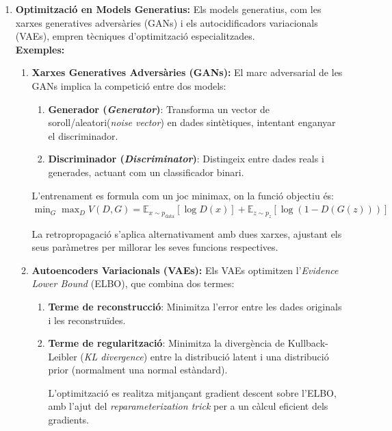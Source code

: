 \begin{enumerate}
 \item \textbf{Optimització en Models Generatius:} Els models generatius, com les xarxes generatives adversàries (GANs) i els autocidificadors variacionals (VAEs), empren tècniques d'optimització especialitzades.\\
 \textbf{Exemples:}

     \begin{enumerate}
      \item \textbf{Xarxes Generatives Adversàries (GANs):} El marc adversarial de les GANs implica la competició entre dos models:
          \begin{enumerate}
           \item \textbf{Generador (\textit{Generator})}: Transforma un vector de soroll/aleatori(\textit{noise vector}) en dades sintètiques, intentant enganyar el discriminador.

           \item \textbf{Discriminador (\textit{Discriminator})}: Distingeix entre dades reals i generades, actuant com un classificador binari.
          \end{enumerate}
           L'entrenament es formula com un joc minimax, on la funció objectiu és:
           $ \min_G \max_D V(D, G) = \mathbb{E}_{x \sim p_{\text{data}}}[\log D(x)] + \mathbb{E}_{z \sim p_z}[\log(1 - D(G(z)))] $

           La retropropagació s'aplica alternativament amb dues xarxes, ajustant els seus paràmetres per millorar les seves funcions respectives.


           \item \textbf{Autoencoders Variacionals (VAEs):} Els VAEs optimitzen l'\textit{Evidence Lower Bound} (ELBO), que combina dos termes:
               \begin{enumerate}
                \item \textbf{Terme de reconstrucció}: Minimitza l'error entre les dades originals i les reconstruïdes.

                \item \textbf{Terme de regularització}: Minimitza la divergència de Kullback-Leibler (\textit{KL divergence}) entre la distribució latent i una distribució prior (normalment una normal estàndard).

                L'optimització es realitza mitjançant gradient descent sobre l'ELBO, amb l'ajut del \textit{reparameterization trick} per a un càlcul eficient dels gradients.


\end{enumerate}
\end{enumerate}
\end{enumerate}
